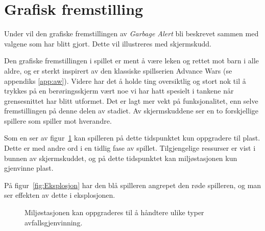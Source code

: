 \section{Grafisk fremstilling}\label{sec:artwork}
Under vil den grafiske fremstillingen av \emph{Garbage Alert} bli beskrevet
sammen med valgene som har blitt gjort. Dette vil illustreres med
skjermskudd.

Den grafiske fremstillingen i spillet er ment å være leken og rettet mot
barn i alle aldre, og er sterkt inspirert av den klassiske spillserien
Advance Wars (se appendiks \ref{app:aw}). Videre har det å holde ting oversiktlig og stort nok til å
trykkes på en berøringsskjerm vært noe vi har hatt spesielt i tankene
når grensesnittet har blitt utformet. Det er lagt mer vekt på
funksjonalitet, enn selve fremstillingen på denne delen av stadiet. Av
skjermskuddene ser en to forskjellige spillere som spiller mot
hverandre.

Som en ser av figur~\ref{fig:Oppgradering} kan spilleren på dette
tidspunktet kun oppgradere til plast. Dette er med andre ord i en tidlig
fase av spillet. Tilgjengelige ressurser er vist i bunnen av
skjermskuddet, og på dette tidspunktet kan miljøstasjonen kun gjenvinne
plast.

På figur~\ref{fig:Eksplosjon} har den blå spilleren angrepet den røde
spilleren, og man ser effekten av dette i eksplosjonen.

\begin{figure} [H]
\centering
\setlength\fboxsep{0.2pt}
\setlength\fboxrule{0.7pt}
\caption{Miljøstasjonen kan oppgraderes til å håndtere ulike typer avfallsgjenvinning.}
\label{fig:Oppgradering}
\end{figure}

